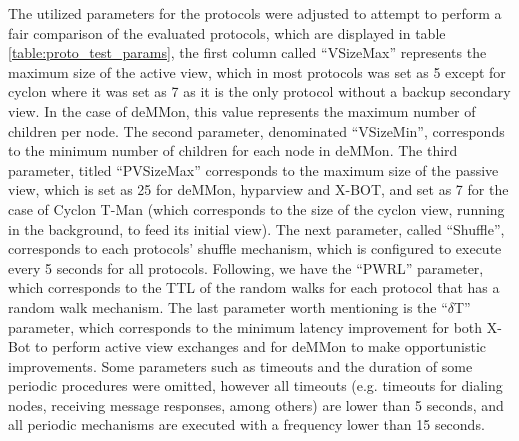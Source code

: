 The utilized parameters for the protocols were adjusted to attempt to perform a fair comparison of the evaluated protocols, which are displayed in table \ref{table:proto_test_params}, the first column called ``VSizeMax'' represents the maximum size of the active view, which in most protocols was set as 5 except for cyclon where it was set as 7 as it is the only protocol without a backup secondary view. In the case of deMMon, this value represents the maximum number of children per node. The second parameter, denominated ``VSizeMin'', corresponds to the minimum number of children for each node in deMMon. The third parameter, titled ``PVSizeMax'' corresponds to the maximum size of the passive view, which is set as 25 for deMMon, hyparview and X-BOT, and set as 7 for the case of Cyclon T-Man (which corresponds to the size of the cyclon view, running in the background, to feed its initial view). The next parameter, called ``Shuffle'', corresponds to each protocols' shuffle mechanism, which is configured to execute every 5 seconds for all protocols. Following, we have the ``PWRL'' parameter, which corresponds to the TTL of the random walks for each protocol that has a random walk mechanism. The last parameter worth mentioning is the ``$\delta$T'' parameter, which corresponds to the minimum latency improvement for both X-Bot to perform active view exchanges and for deMMon to make opportunistic improvements. Some parameters such as timeouts and the duration of some periodic procedures were omitted, however all timeouts (e.g. timeouts for dialing nodes, receiving message responses, among others) are lower than 5 seconds, and all periodic mechanisms are executed with a frequency lower than 15 seconds.

